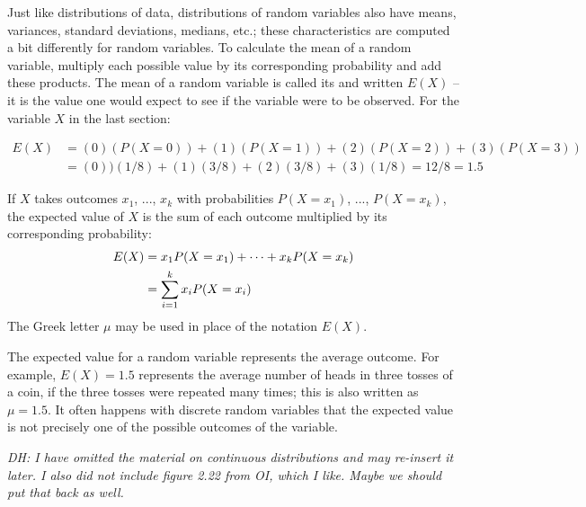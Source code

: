 Just like distributions of data, distributions of random variables also have means, variances, standard deviations, medians, etc.; these characteristics are computed a bit differently for random variables. To calculate the mean of a random variable, multiply each possible value by its corresponding probability and add these products. The mean of a random variable is called its  and written $E(X)$ -- it is the value one would expect to see if the variable were to be observed. For the variable $X$ in the last section:

\begin{align*}
E(X) &= (0)(P(X=0)) + (1)(P(X=1)) + (2)(P(X=2)) + (3)(P(X = 3)) \\
	&= (0))(1/8) + (1)(3/8) + (2)(3/8) + (3)(1/8) = 12/8 = 1.5
\end{align*}

\begin{termBox}{
If $X$ takes outcomes $x_1$, ..., $x_k$ with probabilities $P(X=x_1)$, ..., $P(X=x_k)$, the expected value of $X$ is the sum of each outcome multiplied by its corresponding probability:
\begin{align}
E(X) 	&= x_1 P(X=x_1) + \cdots + x_k P(X=x_k) \notag \\
	&= \sum_{i=1}^{k}x_iP(X=x_i)
\end{align}
The Greek letter $\mu$ may be used in place of the notation $E(X)$.}
\end{termBox}
The expected value for a random variable represents the average outcome. For example, $E(X)=1.5$ represents the average number of heads in three tosses of a coin, if the three tosses were repeated many times; this is also written as $\mu=1.5$.  It often happens with discrete random variables that the expected value is not precisely one of the possible outcomes of the variable.

\textit{DH: I have omitted the material on continuous distributions and may re-insert it later. I also did not include figure 2.22 from OI, which I like.  Maybe we should put that back as well.} 

